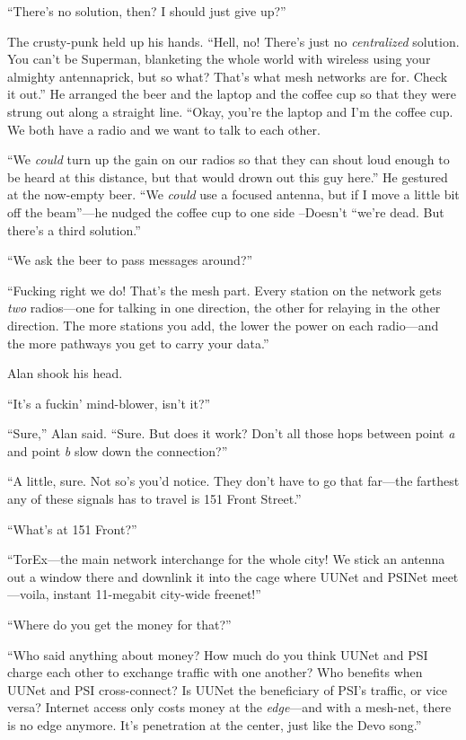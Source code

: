 \documentclass{article}
\begin{document}
``There's no solution, then?  I should just give up?''

The crusty-punk held up his hands.  ``Hell, no!  There's just no
\textit{centralized} solution.  You can't be Superman, blanketing the
whole world with wireless using your almighty antennaprick, but so
what?  That's what mesh networks are for.  Check it out.'' He arranged
the beer and the laptop and the coffee cup so that they were strung
out along a straight line.  ``Okay, you're the laptop and I'm the
coffee cup.  We both have a radio and we want to talk to each other.

``We \textit{could} turn up the gain on our radios so that they can
shout loud enough to be heard at this distance, but that would drown
out this guy here.'' He gestured at the now-empty beer.  ``We
\textit{could} use a focused antenna, but if I move a little bit off
the beam''---he nudged the coffee cup to one side --Doesn't ``we're
dead.  But there's a third solution.''

``We ask the beer to pass messages around?''

``Fucking right we do!  That's the mesh part.  Every station on the
network gets \textit{two} radios---one for talking in one direction,
the other for relaying in the other direction.  The more stations you
add, the lower the power on each radio---and the more pathways you get
to carry your data.''

Alan shook his head.

``It's a fuckin' mind-blower, isn't it?''

``Sure,'' Alan said.  ``Sure.  But does it work?  Don't all those hops
between point \textit{a} and point \textit{b} slow down the
connection?''

``A little, sure.  Not so's you'd notice.  They don't have to go that
far---the farthest any of these signals has to travel is 151 Front
Street.''

``What's at 151 Front?''

``TorEx---the main network interchange for the whole city!  We stick
an antenna out a window there and downlink it into the cage where
UUNet and PSINet meet---voila, instant 11-megabit city-wide freenet!''

``Where do you get the money for that?''

``Who said anything about money?  How much do you think UUNet and PSI
charge each other to exchange traffic with one another?  Who benefits
when UUNet and PSI cross-connect?  Is UUNet the beneficiary of PSI's
traffic, or vice versa?  Internet access only costs money at the
\textit{edge}---and with a mesh-net, there is no edge anymore.  It's
penetration at the center, just like the Devo song.''
\end{document}
